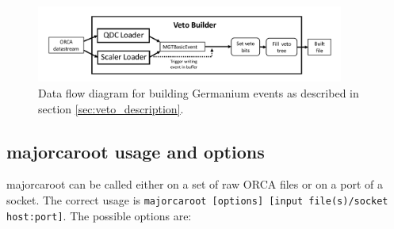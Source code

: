 \documentclass[/main.tex]{subfiles}
\begin{document}
\begin{figure} 
  \includegraphics[width=0.9\textwidth]{VetoBuilderDiagram}
  \caption[Diagram of data flow for building veto events]{\label{fig:veto_diagram}
    Data flow diagram for building Germanium events as described in section \ref{sec:veto_description}.}
\end{figure}

\subsection{majorcaroot usage and options} \label{sec:majorcaroot_options}
majorcaroot can be called either on a set of raw ORCA files or on a port of a socket.
The correct usage is \texttt{majorcaroot [options] [input file(s)/socket host:port]}.
The possible options are:
\end{document}
